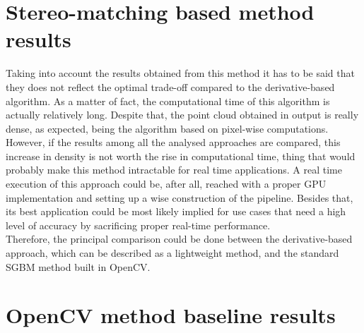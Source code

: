 \section{Stereo-matching based method results}
\label{section:stereo-match-results}

Taking into account the results obtained from this method it has to be said that they does not reflect the optimal trade-off compared to the derivative-based algorithm.
As a matter of fact, the computational time of this algorithm is actually relatively long. 
Despite that, the point cloud obtained in output is really dense, as expected, being the algorithm based on pixel-wise computations. 
However, if the results among all the analysed approaches are compared, this increase in density is not worth the rise in computational time, thing that would probably make this method intractable for real time applications.
A real time execution of this approach could be, after all, reached with a proper GPU implementation and setting up a wise construction of the pipeline.
Besides that, its best application could be most likely implied for use cases that need a high level of accuracy by sacrificing proper real-time performance.\\
Therefore, the principal comparison could be done between the derivative-based approach, which can be described as a lightweight method, and the standard SGBM method built in OpenCV.


\section{OpenCV method baseline results}
\label{section:opencv-baseline-results}

